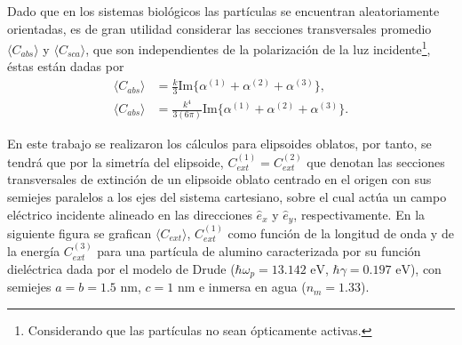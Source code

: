 Dado que en los sistemas biológicos las partículas se encuentran aleatoriamente orientadas, es de gran utilidad considerar las secciones transversales promedio $\langle C_{abs}\rangle$ y $\langle C_{sca}\rangle$, que son independientes de la polarización de la luz incidente\footnote{Considerando que las partículas no sean ópticamente activas.}, éstas están dadas por \cite{Bohren}
\begin{align*}
	\langle C_{abs}\rangle &= \frac{k}{3} \text{Im}\{\alpha^{(1)}+\alpha^{(2)}+\alpha^{(3)}\},\\
	\langle C_{abs}\rangle &= \frac{k^4}{3(6\pi)} \text{Im}\{\alpha^{(1)}+\alpha^{(2)}+\alpha^{(3)}\}.
\end{align*}

En este trabajo se realizaron los cálculos para elipsoides oblatos, por tanto, se tendrá que por la simetría del elipsoide, $C_{ext}^{(1)}=C_{ext}^{(2)}$ que denotan las secciones transversales de extinción de un elipsoide oblato centrado en el origen con sus semiejes paralelos a los ejes del sistema cartesiano, sobre el cual actúa un campo eléctrico incidente alineado en las direcciones $\hat{e}_x$ y $\hat{e}_y$, respectivamente. En la siguiente figura se grafican $\langle C_{ext}\rangle$, $C_{ext}^{(1)}$ como función de la longitud de onda y de la energía $C_{ext}^{(3)}$ para una partícula de alumino caracterizada por su función dieléctrica dada por el modelo de Drude ($\hbar\omega_p=13.142\text{ eV}$, $\hbar\gamma=0.197\text{ eV}$), con semiejes $a=b=1.5\text{ nm}$, $c=1\text{ nm}$ e inmersa en agua ($n_m=1.33$).

